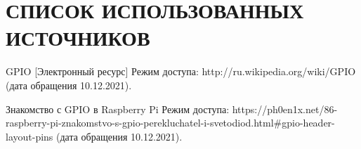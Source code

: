\section*{СПИСОК ИСПОЛЬЗОВАННЫХ ИСТОЧНИКОВ}

\begingroup
\renewcommand{\section}[2]{}
\begin{thebibliography}{}
	 GPIO [Электронный ресурс] Режим доступа: http://ru.wikipedia.org/wiki/GPIO (дата обращения 10.12.2021).
	
	 Знакомство с GPIO в Raspberry Pi Режим доступа: https://ph0en1x.net/86-raspberry-pi-znakomstvo-s-gpio-perekluchatel-i-svetodiod.html#gpio-header-layout-pins (дата обращения 10.12.2021).
	
\end{thebibliography}
\endgroup

\pagebreak